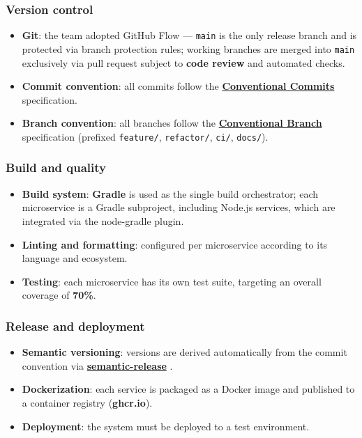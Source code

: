 \subsubsection{Version control}

\begin{itemize}
  \item \textbf{Git}: the team adopted GitHub Flow --- \texttt{main} is the only release branch and is protected via branch protection rules; working branches are merged into \texttt{main} exclusively via pull request subject to \textbf{code review} and automated checks.
  \item \textbf{Commit convention}: all commits follow the \href{https://www.conventionalcommits.org/en/v1.0.0/}{\textbf{Conventional Commits}} specification.
  \item \textbf{Branch convention}: all branches follow the \href{https://conventionalbranch.org/}{\textbf{Conventional Branch}} specification (prefixed \texttt{feature/}, \texttt{refactor/}, \texttt{ci/}, \texttt{docs/}).
\end{itemize}

\subsubsection{Build and quality}

\begin{itemize}
  \item \textbf{Build system}: \textbf{Gradle} is used as the single build orchestrator; each microservice is a Gradle subproject, including Node.js services, which are integrated via the node-gradle plugin.
  \item \textbf{Linting and formatting}: configured per microservice according to its language and ecosystem.
  \item \textbf{Testing}: each microservice has its own test suite, targeting an overall coverage of \textbf{70\%}.
\end{itemize}

\subsubsection{Release and deployment}

\begin{itemize}
  \item \textbf{Semantic versioning}: versions are derived automatically from the commit convention via \href{https://semantic-release.gitbook.io/semantic-release/}{\textbf{semantic-release}} .
  \item \textbf{Dockerization}: each service is packaged as a Docker image and published to a container registry (\textbf{ghcr.io}).
  \item \textbf{Deployment}: the system must be deployed to a test environment.
\end{itemize}

